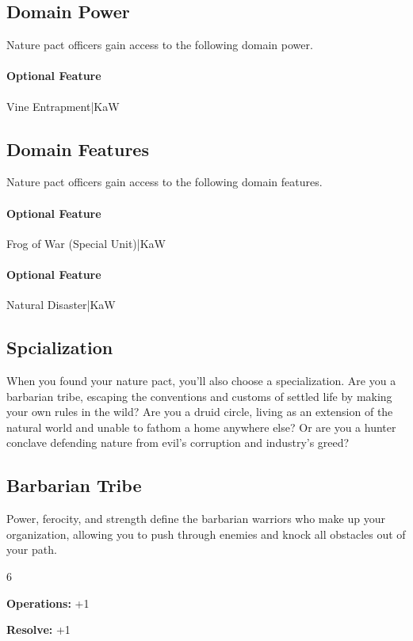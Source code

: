\documentclass[10pt,a4paper,twoside,bg=print,twocolumn,openany,nodeprecatedcode]{dndbook}
\begin{document}
\subsection{Domain Power}
Nature pact officers gain access to the following domain power.

\paragraph{Optional Feature}
Vine Entrapment|KaW

\subsection{Domain Features}
Nature pact officers gain access to the following domain features.

\paragraph{Optional Feature}
Frog of War (Special Unit)|KaW

\paragraph{Optional Feature}
Natural Disaster|KaW

\subsection{Spcialization}
When you found your nature pact, you'll also choose a specialization. Are you a barbarian tribe, escaping the conventions and customs of settled life by making your own rules in the wild? Are you a druid circle, living as an extension of the natural world and unable to fathom a home anywhere else? Or are you a hunter conclave defending nature from evil's corruption and industry's greed?

\subsection{Barbarian Tribe}
Power, ferocity, and strength define the barbarian warriors who make up your organization, allowing you to push through enemies and knock all obstacles out of your path.

{\par \vspace { 9pt plus 3pt minus 3pt } \noindent  {} \nopagebreak }

\begin{itemize}
\begin{multicols}{6}
\item \textbf{Operations:} +1
\item \textbf{Resolve:} +1
\end{multicols}

\end{itemize}
\end{document}
